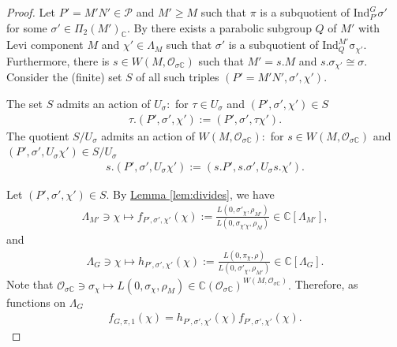 \documentclass[10pt]{amsart}
\theoremstyle{definition}
\numberwithin{equation}{section}
\numberwithin{equation}{subsection}
\newcommand{\Ind}{\mathrm{Ind}}
\newcommand{\CC}{\mathbb{C}}
\begin{document}
\begin{proof} 
Let $P'=M'N'\in \mathcal{P}$ and $M'\ge M$ such that $\pi$ is a subquotient of $\Ind_{P'}^G \sigma'$ for some $\sigma'\in \Pi_2(M')_\CC.$ By \cite[Th\'eor\`eme VI.5.4]{Representation-p-adic} there exists a parabolic subgroup $Q$ of $M'$ with Levi component $M$ and $\chi'\in \Lambda_M$ such that $\sigma'$ is a subquotient of $\mathrm{Ind}_{Q}^{M'} \mathrm{\sigma}_{\chi'}.$ Furthermore, there is $s\in W(M,\mathcal{O}_{\sigma\CC})$ such that $M'=s.M$ and $s.\sigma_{\chi'}\cong \sigma.$ Consider the (finite) set $S$ of all such triples $(P'=M'N',\sigma',\chi').$ 

The set $S$ admits an action of $U_\sigma:$ for $\tau\in U_\sigma$ and $(P',\sigma',\chi')\in S$
\begin{align*}
   \tau. (P',\sigma',\chi'):=(P',\sigma',\tau\chi').
\end{align*}
The quotient $S/U_\sigma$ admits an action of $W(M,\mathcal{O}_{\sigma\CC}):$ for $s\in W(M,\mathcal{O}_{\sigma\CC})$ and $(P',\sigma',U_\sigma\chi')\in S/U_\sigma$
\begin{align*}
   s. (P',\sigma',U_\sigma\chi'):=(s.P',s.\sigma',U_\sigma s.\chi').
\end{align*}

 
 Let $(P',\sigma',\chi')\in S.$ By \hyperref[lem:divides]{Lemma \ref{lem:divides}}, we have
\begin{align}\label{eq:intermediate}
     \Lambda_{M'}\ni\chi \mapsto f_{P',\sigma',\chi'}(\chi):=\frac{L(0,\sigma'_\chi,\rho_{M'})}{L(0,\sigma_{\chi'\chi},\rho_M)}\in\CC[\Lambda_{M'}],
\end{align}
and
\begin{align}\label{eq:intermediate2}
    \Lambda_{G}\ni\chi \mapsto h_{P',\sigma',\chi'}(\chi):=\frac{L(0,\pi_{\chi},\rho)}{L(0,\sigma'_\chi,\rho_{M'})} \in \CC[\Lambda_{G}].
\end{align}
Note that $\mathcal{O}_{\sigma\CC}\ni \sigma_\chi\mapsto L(0,\sigma_\chi,\rho_M)\in \CC(\mathcal{O}_{\sigma\CC})^{W(M,\mathcal{O}_{\sigma\CC})}.$ Therefore, as functions on $\Lambda_G$
\begin{align*}
    f_{G,\pi,1}(\chi) = h_{P',\sigma',\chi'}(\chi)f_{P',\sigma',\chi'}(\chi).
\end{align*}


\end{proof}
\end{document}
